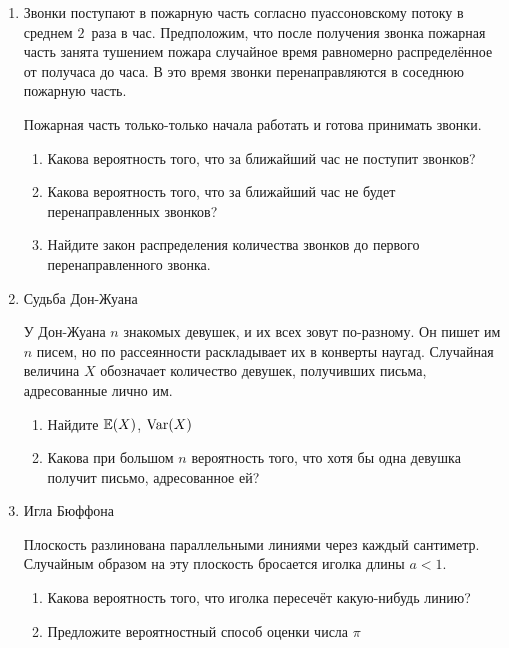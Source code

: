 \documentclass[12pt, a4paper]{article}\usepackage[]{graphicx}\usepackage[]{color}
\begin{document}
\begin{enumerate}

\item Звонки поступают в пожарную часть согласно пуассоновскому потоку в среднем $2$~раза в час. Предположим, что после получения звонка пожарная часть занята тушением пожара случайное время равномерно распределённое от получаса до часа. В это время звонки перенаправляются в соседнюю пожарную часть.

Пожарная часть только-только начала работать и готова принимать звонки.
\begin{enumerate}
\item Какова вероятность того, что за ближайший час не поступит звонков?
\item Какова вероятность того, что за ближайший час не будет перенаправленных звонков?
\item Найдите закон распределения количества звонков до первого перенаправленного звонка.
\end{enumerate}

\item  Судьба Дон-Жуана


У Дон-Жуана $n$  знакомых девушек, и их всех зовут по-разному. Он пишет
им $n$  писем, но по рассеянности раскладывает их в конверты
наугад. Случайная величина $X$ обозначает количество девушек, получивших письма, адресованные лично им.

\begin{enumerate}
\item Найдите $\mathbb{E}(X)$, $\operatorname{Var}(X)$
\item Какова при большом $n$ вероятность того, что хотя бы одна девушка получит письмо, адресованное ей?
\end{enumerate}

\item Игла Бюффона

Плоскость разлинована параллельными линиями через каждый сантиметр. Случайным образом на эту плоскость бросается иголка длины $a<1$.

\begin{enumerate}
\item Какова вероятность того, что иголка пересечёт какую-нибудь линию?
\item Предложите вероятностный способ оценки числа $\pi$
\end{enumerate}


\end{enumerate}
\end{document}
